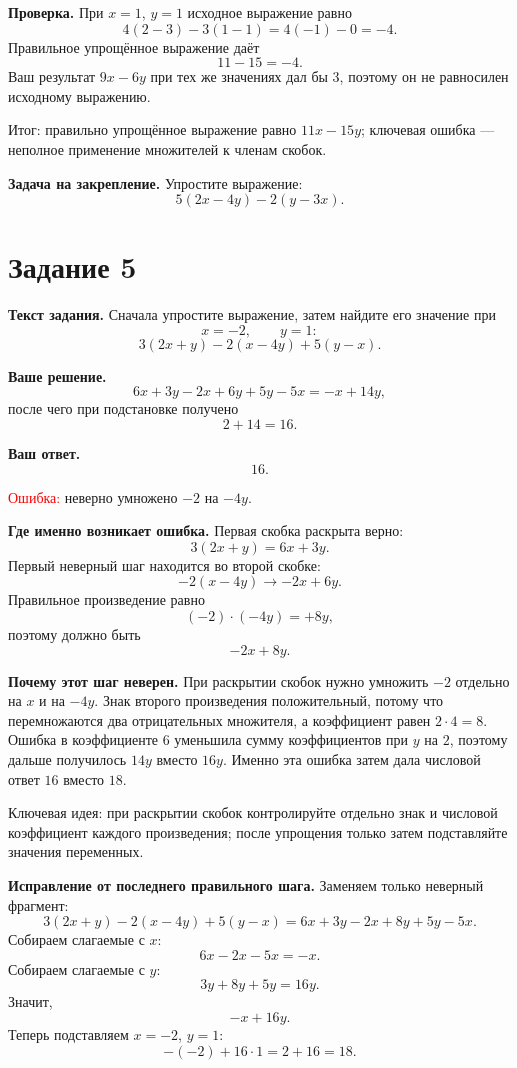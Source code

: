 \documentclass[12pt,a4paper]{article}
\begin{document}
\textbf{Проверка.}
При $x=1$, $y=1$ исходное выражение равно
\[
4(2-3)-3(1-1)=4(-1)-0=-4.
\]
Правильное упрощённое выражение даёт
\[
11-15=-4.
\]
Ваш результат $9x-6y$ при тех же значениях дал бы $3$, поэтому он не равносилен исходному выражению.

\textcolor{teal!60!black}{Итог:} правильно упрощённое выражение равно $11x-15y$; ключевая ошибка --- неполное применение множителей к членам скобок.

\textbf{Задача на закрепление.}
Упростите выражение:
\[
5(2x-4y)-2(y-3x).
\]

\newpage
{}\label{task:5}
\section*{Задание 5}

\textbf{Текст задания.}
Сначала упростите выражение, затем найдите его значение при
\[
x=-2,\qquad y=1:
\]
\[
3(2x+y)-2(x-4y)+5(y-x).
\]

\textbf{Ваше решение.}
\[
6x+3y-2x+6y+5y-5x=-x+14y,
\]
после чего при подстановке получено
\[
2+14=16.
\]

\textbf{Ваш ответ.}
\[
16.
\]

\textcolor{red}{Ошибка:} неверно умножено $-2$ на $-4y$.

\textbf{Где именно возникает ошибка.}
Первая скобка раскрыта верно:
\[
3(2x+y)=6x+3y.
\]
Первый неверный шаг находится во второй скобке:
\[
-2(x-4y)\rightarrow -2x+6y.
\]
Правильное произведение равно
\[
(-2)\cdot(-4y)=+8y,
\]
поэтому должно быть
\[
-2x+8y.
\]

\textbf{Почему этот шаг неверен.}
При раскрытии скобок нужно умножить $-2$ отдельно на $x$ и на $-4y$. Знак второго произведения положительный, потому что перемножаются два отрицательных множителя, а коэффициент равен $2\cdot 4=8$. Ошибка в коэффициенте $6$ уменьшила сумму коэффициентов при $y$ на $2$, поэтому дальше получилось $14y$ вместо $16y$. Именно эта ошибка затем дала числовой ответ $16$ вместо $18$.

\textcolor{blue!60!black}{Ключевая идея:} при раскрытии скобок контролируйте отдельно знак и числовой коэффициент каждого произведения; после упрощения только затем подставляйте значения переменных.

\textbf{Исправление от последнего правильного шага.}
Заменяем только неверный фрагмент:
\[
3(2x+y)-2(x-4y)+5(y-x)
=6x+3y-2x+8y+5y-5x.
\]
Собираем слагаемые с $x$:
\[
6x-2x-5x=-x.
\]
Собираем слагаемые с $y$:
\[
3y+8y+5y=16y.
\]
Значит,
\[
-x+16y.
\]
Теперь подставляем $x=-2$, $y=1$:
\[
-(-2)+16\cdot 1=2+16=18.
\]
\end{document}
